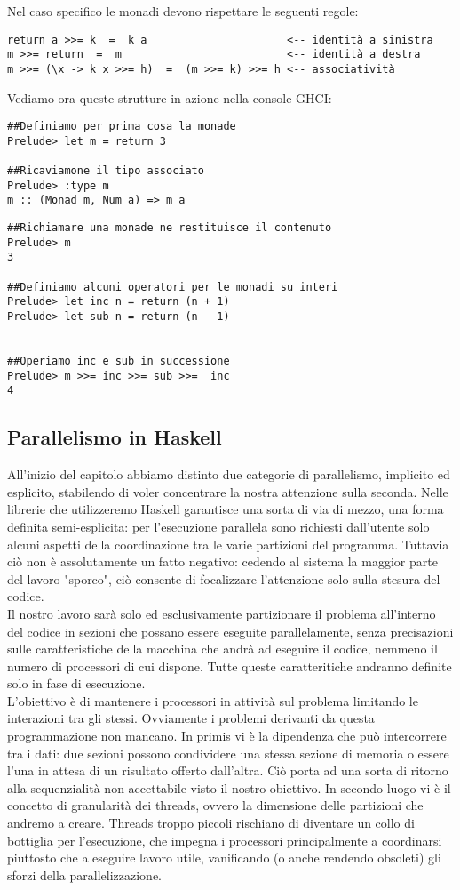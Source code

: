 Nel caso specifico le monadi devono rispettare le seguenti regole:
\begin{verbatim}
return a >>= k  =  k a                      <-- identità a sinistra
m >>= return  =  m                          <-- identità a destra
m >>= (\x -> k x >>= h)  =  (m >>= k) >>= h <-- associatività
\end{verbatim}
Vediamo ora queste strutture in azione nella console GHCI:
\begin{verbatim}
##Definiamo per prima cosa la monade
Prelude> let m = return 3

##Ricaviamone il tipo associato
Prelude> :type m
m :: (Monad m, Num a) => m a
\end{verbatim}
\newpage
\begin{verbatim}
##Richiamare una monade ne restituisce il contenuto
Prelude> m
3

##Definiamo alcuni operatori per le monadi su interi
Prelude> let inc n = return (n + 1)
Prelude> let sub n = return (n - 1)


##Operiamo inc e sub in successione
Prelude> m >>= inc >>= sub >>=  inc
4
\end{verbatim}
\subsection{Parallelismo in Haskell}
All'inizio del capitolo abbiamo distinto due categorie di parallelismo, implicito ed esplicito, stabilendo di voler concentrare la nostra attenzione sulla seconda. Nelle librerie che utilizzeremo Haskell garantisce una sorta di via di mezzo, una forma definita semi-esplicita: per l'esecuzione parallela sono richiesti dall'utente solo alcuni aspetti della coordinazione tra le varie partizioni del programma. Tuttavia ciò non è assolutamente un fatto negativo: cedendo al sistema la maggior parte del lavoro "sporco", ciò consente di focalizzare l'attenzione solo sulla stesura del codice.\\
Il nostro lavoro sarà solo ed esclusivamente partizionare il problema all'interno del codice in sezioni che possano essere eseguite parallelamente, senza precisazioni sulle caratteristiche della macchina che andrà ad eseguire il codice, nemmeno il numero di processori di cui dispone. Tutte queste caratteritiche andranno definite solo in fase di esecuzione.\\
L'obiettivo è di mantenere i processori in attività sul problema limitando le interazioni tra gli stessi. Ovviamente i problemi derivanti da questa programmazione non mancano. In primis vi è la dipendenza che può intercorrere tra i dati: due sezioni possono condividere una stessa sezione di memoria o essere l'una in attesa di un risultato offerto dall'altra. Ciò porta ad una sorta di ritorno alla sequenzialità non accettabile visto il nostro obiettivo. In secondo luogo vi è il concetto di granularità dei threads, ovvero la dimensione delle partizioni che andremo a creare. Threads troppo piccoli rischiano di diventare un collo di bottiglia per l'esecuzione, che impegna i processori principalmente a coordinarsi piuttosto che a eseguire lavoro utile, vanificando (o anche rendendo obsoleti) gli sforzi della parallelizzazione.
